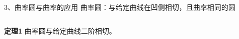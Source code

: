 \begin{frame}{3、曲率圆与曲率的应用}
	\linespread{1.2} \pause 
	{\bb 曲率圆：}与给定曲线在凹侧相切，且曲率相同的圆
	
	\pause\vspace{1ex}
	\begin{columns}
			\begin{center}
			\end{center}
	\end{columns}
	
	\pause 
	\begin{block}{\bf 定理1}
		曲率圆与给定曲线二阶相切。
	\end{block}
\end{frame}

